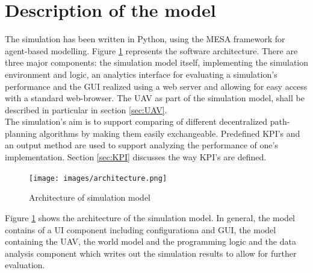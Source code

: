 \section{Description of the model}
The simulation has been written in Python, using the MESA framework for agent-based modelling. Figure \ref{fig:architecture} represents the software architecture. There are three major components: the simulation model itself, implementing the simulation environment and logic, an analytics interface for evaluating a simulation's performance and the GUI realized using a web server and allowing for easy access with a standard web-browser. The UAV as part of the simulation model, shall be described in particular in section \ref{sec:UAV}.\\
The simulation's aim is to support comparing of different decentralized path-planning algorithms by making them easily exchangeable. Predefined KPI's and an output method are used to support analyzing the performance of one's implementation. Section \ref{sec:KPI} discusses the way KPI's are defined.\\
\begin{figure}[htbp]\label{fig:architecture}
	\centering
	\texttt{[image: images/architecture.png]} 
	\caption{Architecture of simulation model}
\end{figure}
Figure \ref{fig:architecture} shows the architecture of the simulation model. In general, the model contains of a UI component including configurationa and GUI, the model containing the UAV, the world model and the programming logic and the data analysis component which writes out the simulation results to allow for further evaluation. 


